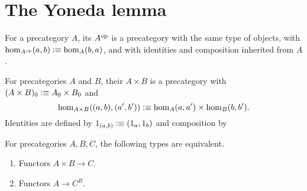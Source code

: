 \documentclass[hott-all.tex]{subfiles}
\begin{document}
\section{The Yoneda lemma}
\label{sec:yoneda}
%

\begin{defn}\label{ct:opposite-category}
  For a precategory $A$, its 
  $A^{\mathrm{op}}$ is a precategory with the same type of objects, with $\hom_{A^{\mathrm{op}}}(a,b) \vcentcolon\equiv \hom_A(b,a)$, and with identities and composition inherited from $A$.
\end{defn}

\begin{defn}\label{ct:prod-cat}
  For precategories $A$ and $B$, their 
  $A\times B$ is a precategory with $(A\times B)_0 \vcentcolon\equiv A_0 \times B_0$ and
  \[\hom_{A\times B}((a,b),(a',b')) \vcentcolon\equiv \hom_A(a,a') \times \hom_B(b,b').\]
  Identities are defined by $1_{(a,b)}\vcentcolon\equiv (1_a,1_b)$ and composition by
\end{defn}

\begin{lem}\label{ct:functorexpadj}
  For precategories $A,B,C$, the following types are equivalent.
  \begin{enumerate}
  \item Functors $A\times B\to C$.
  \item Functors $A\to C^B$.
  \end{enumerate}
\end{lem}
%
%
\end{document}
